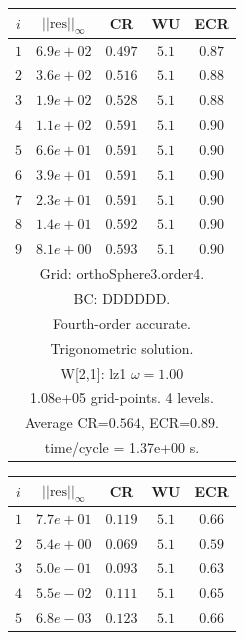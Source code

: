\begin{table}[hbt]
\begin{center}
{\tablefontsize
\begin{tabular}{|c|c|c|c|c|} \hline 
 $i$   & $\vert\vert\mbox{res}\vert\vert_\infty$  &  CR     &  WU    & ECR  \\   \hline 
 $ 1$  & $ 6.9e+02$ & $0.497$ & $ 5.1$ & $0.87$ \\ 
 $ 2$  & $ 3.6e+02$ & $0.516$ & $ 5.1$ & $0.88$ \\ 
 $ 3$  & $ 1.9e+02$ & $0.528$ & $ 5.1$ & $0.88$ \\ 
 $ 4$  & $ 1.1e+02$ & $0.591$ & $ 5.1$ & $0.90$ \\ 
 $ 5$  & $ 6.6e+01$ & $0.591$ & $ 5.1$ & $0.90$ \\ 
 $ 6$  & $ 3.9e+01$ & $0.591$ & $ 5.1$ & $0.90$ \\ 
 $ 7$  & $ 2.3e+01$ & $0.591$ & $ 5.1$ & $0.90$ \\ 
 $ 8$  & $ 1.4e+01$ & $0.592$ & $ 5.1$ & $0.90$ \\ 
 $ 9$  & $ 8.1e+00$ & $0.593$ & $ 5.1$ & $0.90$ \\ 
\hline 
\multicolumn{5}{|c|}{Grid: orthoSphere3.order4.}  \\
\multicolumn{5}{|c|}{BC: DDDDDD.}  \\
\multicolumn{5}{|c|}{Fourth-order accurate.}  \\
\multicolumn{5}{|c|}{Trigonometric solution.}  \\
\multicolumn{5}{|c|}{W[2,1]: lz1 $\omega=1.00$}  \\
\multicolumn{5}{|c|}{1.08e+05 grid-points. 4 levels.}  \\
\multicolumn{5}{|c|}{Average CR=$0.564$, ECR=$0.89$.}  \\
\multicolumn{5}{|c|}{time/cycle = 1.37e+00 s.}  \\
\hline 
\end{tabular}
\begin{tabular}{|c|c|c|c|c|} \hline 
 $i$   & $\vert\vert\mbox{res}\vert\vert_\infty$  &  CR     &  WU    & ECR  \\   \hline 
 $ 1$  & $ 7.7e+01$ & $0.119$ & $ 5.1$ & $0.66$ \\ 
 $ 2$  & $ 5.4e+00$ & $0.069$ & $ 5.1$ & $0.59$ \\ 
 $ 3$  & $ 5.0e-01$ & $0.093$ & $ 5.1$ & $0.63$ \\ 
 $ 4$  & $ 5.5e-02$ & $0.111$ & $ 5.1$ & $0.65$ \\ 
 $ 5$  & $ 6.8e-03$ & $0.123$ & $ 5.1$ & $0.66$ \\ 

\end{tabular}}
\end{center}
\end{table}
